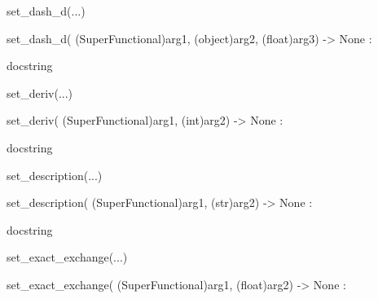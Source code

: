 \documentclass[letterpaper,10pt,english]{sphinxmanual}
\begin{document}
\begin{description}
\begin{description}
\begin{DUlineblock}{0em}
\begin{DUlineblock}{\DUlineblockindent}
\begin{DUlineblock}{\DUlineblockindent}
\item[] 
\end{DUlineblock}
\end{DUlineblock}
\item[] set\_dash\_d(...)
\item[]
\begin{DUlineblock}{\DUlineblockindent}
\item[] set\_dash\_d( (SuperFunctional)arg1, (object)arg2, (float)arg3) -\textgreater{} None :
\item[]
\begin{DUlineblock}{\DUlineblockindent}
\item[] docstring
\item[] 
\end{DUlineblock}
\end{DUlineblock}
\item[] set\_deriv(...)
\item[]
\begin{DUlineblock}{\DUlineblockindent}
\item[] set\_deriv( (SuperFunctional)arg1, (int)arg2) -\textgreater{} None :
\item[]
\begin{DUlineblock}{\DUlineblockindent}
\item[] docstring
\item[] 
\end{DUlineblock}
\end{DUlineblock}
\item[] set\_description(...)
\item[]
\begin{DUlineblock}{\DUlineblockindent}
\item[] set\_description( (SuperFunctional)arg1, (str)arg2) -\textgreater{} None :
\item[]
\begin{DUlineblock}{\DUlineblockindent}
\item[] docstring
\item[] 
\end{DUlineblock}
\end{DUlineblock}
\item[] set\_exact\_exchange(...)
\item[]
\begin{DUlineblock}{\DUlineblockindent}
\item[] set\_exact\_exchange( (SuperFunctional)arg1, (float)arg2) -\textgreater{} None :
\item[]
\begin{DUlineblock}{\DUlineblockindent}

\end{DUlineblock}
\end{DUlineblock}
\end{DUlineblock}
\end{description}
\end{description}
\end{document}
